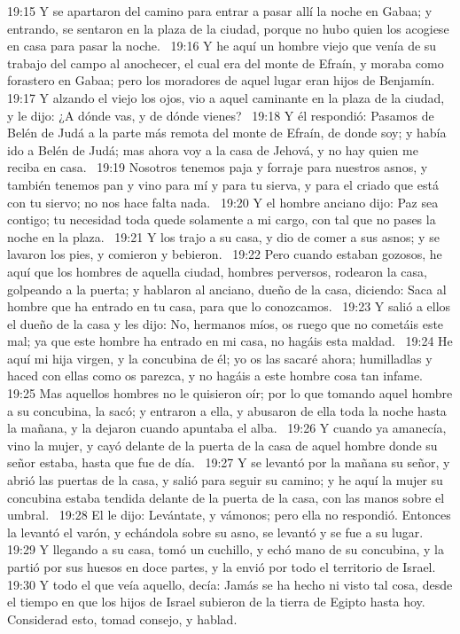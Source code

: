 19:15 Y se apartaron del camino para entrar a pasar allí la noche en Gabaa; y entrando, se sentaron en la plaza de la ciudad, porque no hubo quien los acogiese en casa para pasar la noche.  
19:16 Y he aquí un hombre viejo que venía de su trabajo del campo al anochecer, el cual era del monte de Efraín, y moraba como forastero en Gabaa; pero los moradores de aquel lugar eran hijos de Benjamín.  
19:17 Y alzando el viejo los ojos, vio a aquel caminante en la plaza de la ciudad, y le dijo: ¿A dónde vas, y de dónde vienes?  
19:18 Y él respondió: Pasamos de Belén de Judá a la parte más remota del monte de Efraín, de donde soy; y había ido a Belén de Judá; mas ahora voy a la casa de Jehová, y no hay quien me reciba en casa.  
19:19 Nosotros tenemos paja y forraje para nuestros asnos, y también tenemos pan y vino para mí y para tu sierva, y para el criado que está con tu siervo; no nos hace falta nada.  
19:20 Y el hombre anciano dijo: Paz sea contigo; tu necesidad toda quede solamente a mi cargo, con tal que no pases la noche en la plaza.  
19:21 Y los trajo a su casa, y dio de comer a sus asnos; y se lavaron los pies, y comieron y bebieron.  
19:22 Pero cuando estaban gozosos, he aquí que los hombres de aquella ciudad, hombres perversos, rodearon la casa, golpeando a la puerta; y hablaron al anciano, dueño de la casa, diciendo: Saca al hombre que ha entrado en tu casa, para que lo conozcamos.  
19:23 Y salió a ellos el dueño de la casa y les dijo: No, hermanos míos, os ruego que no cometáis este mal; ya que este hombre ha entrado en mi casa, no hagáis esta maldad.  
19:24 He aquí mi hija virgen, y la concubina de él; yo os las sacaré ahora; humilladlas y haced con ellas como os parezca, y no hagáis a este hombre cosa tan infame.  
19:25 Mas aquellos hombres no le quisieron oír; por lo que tomando aquel hombre a su concubina, la sacó; y entraron a ella, y abusaron de ella toda la noche hasta la mañana, y la dejaron cuando apuntaba el alba.  
19:26 Y cuando ya amanecía, vino la mujer, y cayó delante de la puerta de la casa de aquel hombre donde su señor estaba, hasta que fue de día.  
19:27 Y se levantó por la mañana su señor, y abrió las puertas de la casa, y salió para seguir su camino; y he aquí la mujer su concubina estaba tendida delante de la puerta de la casa, con las manos sobre el umbral.  
19:28 El le dijo: Levántate, y vámonos; pero ella no respondió. Entonces la levantó el varón, y echándola sobre su asno, se levantó y se fue a su lugar.  
19:29 Y llegando a su casa, tomó un cuchillo, y echó mano de su concubina, y la partió por sus huesos en doce partes, y la envió por todo el territorio de Israel.  
19:30 Y todo el que veía aquello, decía: Jamás se ha hecho ni visto tal cosa, desde el tiempo en que los hijos de Israel subieron de la tierra de Egipto hasta hoy. Considerad esto, tomad consejo, y hablad.  
